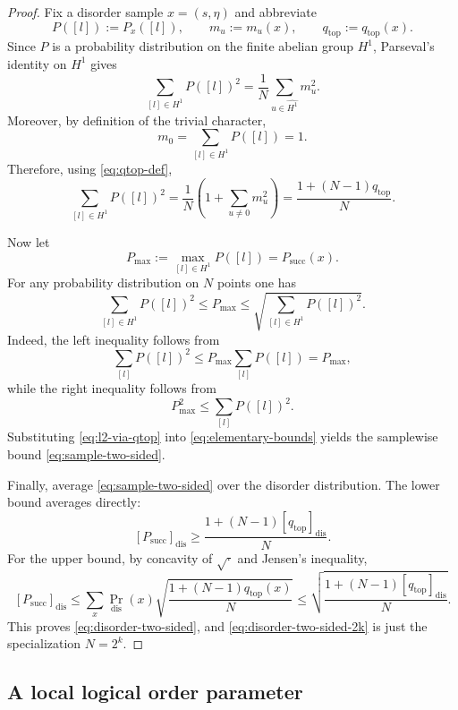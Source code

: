 \documentclass[twoside,english,aps,showpacs,pra,superscriptaddress]{revtex4-2}
\begin{document}
\begin{proof}
Fix a disorder sample $x=(s,\eta)$ and abbreviate
\[
P([l]) := P_x([l]), \qquad m_u:=m_u(x), \qquad q_{\mathrm{top}}:=q_{\mathrm{top}}(x).
\]
Since $P$ is a probability distribution on the finite abelian group $H^1$, Parseval's identity on $H^1$ gives
\begin{equation}\label{eq:parseval-proof}
\sum_{[l]\in H^1} P([l])^2
=
\frac{1}{N}\sum_{u\in \widehat{H^1}} m_u^2.
\end{equation}
Moreover, by definition of the trivial character,
\[
m_0=\sum_{[l]\in H^1}P([l])=1.
\]
Therefore, using \eqref{eq:qtop-def},
\begin{equation}\label{eq:l2-via-qtop}
\sum_{[l]\in H^1} P([l])^2
=
\frac{1}{N}\left(1+\sum_{u\neq 0}m_u^2\right)
=
\frac{1+(N-1)q_{\mathrm{top}}}{N}.
\end{equation}

Now let
\[
P_{\max}:=\max_{[l]\in H^1}P([l])=P_{\mathrm{succ}}(x).
\]
For any probability distribution on $N$ points one has
\begin{equation}\label{eq:elementary-bounds}
\sum_{[l]\in H^1}P([l])^2 \le P_{\max} \le \sqrt{\sum_{[l]\in H^1}P([l])^2}.
\end{equation}
Indeed, the left inequality follows from
\[
\sum_{[l]}P([l])^2 \le P_{\max}\sum_{[l]}P([l])=P_{\max},
\]
while the right inequality follows from
\[
P_{\max}^2 \le \sum_{[l]}P([l])^2.
\]
Substituting \eqref{eq:l2-via-qtop} into \eqref{eq:elementary-bounds} yields the samplewise bound \eqref{eq:sample-two-sided}.

Finally, average \eqref{eq:sample-two-sided} over the disorder distribution. The lower bound averages directly:
\[
[P_{\mathrm{succ}}]_{\mathrm{dis}}
\ge
\frac{1+(N-1)[q_{\mathrm{top}}]_{\mathrm{dis}}}{N}.
\]
For the upper bound, by concavity of $\sqrt{\cdot}$ and Jensen's inequality,
\[
[P_{\mathrm{succ}}]_{\mathrm{dis}}
\le
\sum_x \Pr_{\mathrm{dis}}(x)\sqrt{\frac{1+(N-1)q_{\mathrm{top}}(x)}{N}}
\le
\sqrt{\frac{1+(N-1)[q_{\mathrm{top}}]_{\mathrm{dis}}}{N}}.
\]
This proves \eqref{eq:disorder-two-sided}, and \eqref{eq:disorder-two-sided-2k} is just the specialization $N=2^k$.
\end{proof}
\subsection{A local logical order parameter}
\end{document}
